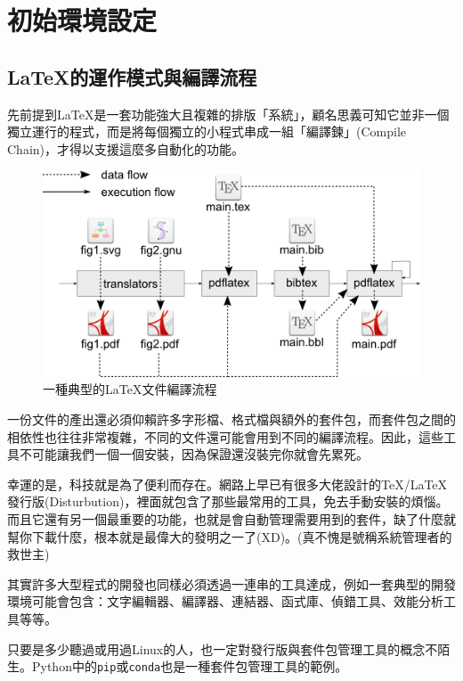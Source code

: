 \documentclass{../indiv}
\begin{document}
	\chapter{初始環境設定}
	\section{\LaTeX 的運作模式與編譯流程}
	先前提到\LaTeX 是一套功能強大且複雜的排版「系統」，顧名思義可知它並非一個獨立運行的程式，而是將每個獨立的小程式串成一組「編譯鍊」(Compile Chain)，才得以支援這麼多自動化的功能。
	\begin{figure}[H]
		\centering
		\includegraphics[width=0.6\linewidth]{process.png}
		\caption{一種典型的\LaTeX 文件編譯流程}
		\label{fig:Compile Process}
	\end{figure}
	一份文件的產出還必須仰賴許多字形檔、格式檔與額外的套件包，而套件包之間的相依性也往往非常複雜，不同的文件還可能會用到不同的編譯流程。因此，這些工具不可能讓我們一個一個安裝，因為保證還沒裝完你就會先累死。
	
	幸運的是，科技就是為了便利而存在。網路上早已有很多大佬設計的\TeX /\LaTeX 發行版(Disturbution)，裡面就包含了那些最常用的工具，免去手動安裝的煩惱。而且它還有另一個最重要的功能，也就是會自動管理需要用到的套件，缺了什麼就幫你下載什麼，根本就是最偉大的發明之一了{\OSfamily(XD)}。(真不愧是號稱系統管理者的救世主)
	\begin{extra}
		\item 其實許多大型程式的開發也同樣必須透過一連串的工具達成，例如一套典型的開發環境可能會包含：文字編輯器、編譯器、連結器、函式庫、偵錯工具、效能分析工具等等。
		\item 只要是多少聽過或用過Linux的人，也一定對發行版與套件包管理工具的概念不陌生。Python中的\texttt{pip}或\texttt{conda}也是一種套件包管理工具的範例。
	\end{extra}
\end{document}
